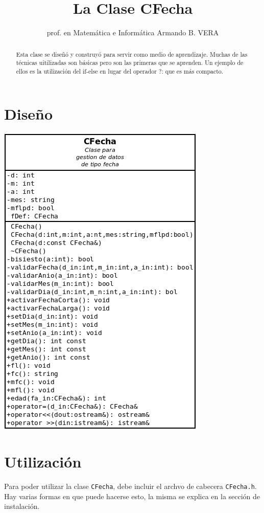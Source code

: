 \documentclass[10pt,a4paper]{article}
\author{prof. en  Matem\'atica e Inform\'atica Armando B. VERA}
\title{La Clase CFecha}
\begin{document}
\begin{abstract}
\textsf{Esta clase se dise\~n\'o y construy\'o para servir como medio de aprendizaje. Muchas de las t\'ecnicas uitilizadas son b\'asicas pero son las primeras que se aprenden. Un ejemplo de ellos es la utilizaci\'on del if-else en lugar del operador ?: que es m\'as compacto.}
\end{abstract}
\section*{Dise\~no}
   
   \begin{center}
    \includegraphics[scale=0.7]{CFecha.png}
   \end{center}
   
\section*{Utilizaci\'on}
Para poder utilizar la clase \texttt{CFecha}, debe incluir el archvo de cabecera \texttt{CFecha.h}. Hay varias formas en que puede hacerse esto, la misma se explica en la secci\'on de instalaci\'on.
\end{document}
